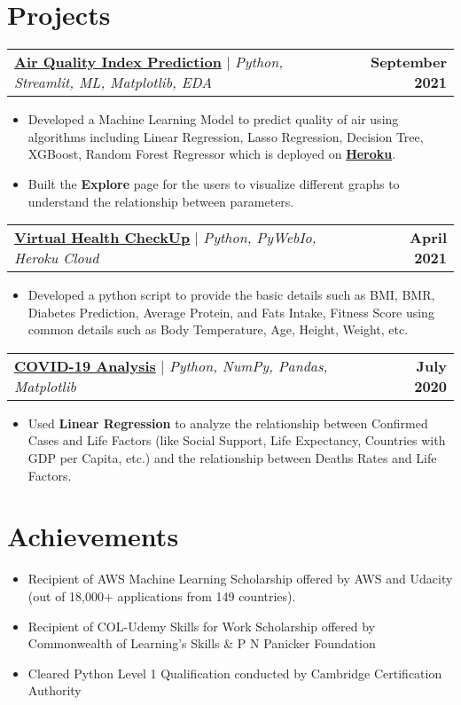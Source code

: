 \documentclass[letterpaper,11pt]{article}
\makeatletter
\newcommand{\resumeProjectItem}[1]{
  \item\small{
    {#1 \vspace{-5pt}}
  }
}
\newcommand{\resumeProjectHeading}[2]{
    \item
    \begin{tabular*}{1.001\textwidth}{l@{\extracolsep{\fill}}r}
      \small#1 & \textbf{\small #2}\\
    \end{tabular*}\vspace{-2pt}
}
\newcommand{\resumeItemListStart}{\begin{itemize}}
\newcommand{\resumeItemListEnd}{\end{itemize}\vspace{-5pt}}
\makeatother
\begin{document}
  
\section{Projects}
\vspace{-10pt}
    \resumeProjectSubHeadingListStart
      \resumeProjectHeading
          {\href{https://github.com/noor12401/Projects/tree/main/AQI}{\color{blue}\textbf{Air Quality Index Prediction}} $|$ \emph{Python, Streamlit, ML, Matplotlib, EDA}}{September 2021}
          \resumeItemListStart
          \resumeProjectItem {Developed a Machine Learning Model to predict quality of air using algorithms including Linear Regression, Lasso Regression, Decision Tree, XGBoost, Random Forest Regressor which is deployed on \textbf{\href{https://airqualityindexcheckerr.herokuapp.com/}{\color{blue}Heroku}}.}
          \resumeProjectItem{Built the \textbf{Explore} page for the users to visualize different graphs to understand the relationship between parameters.}
          \resumeItemListEnd
          \vspace{-24pt}
          \resumeProjectSubHeadingListStart
      \resumeProjectHeading
          {\href{https://github.com/noor12401/VirtualHealth}{\color{blue}\textbf{Virtual Health CheckUp}} $|$ \emph{Python, PyWebIo, Heroku Cloud}}{April 2021}
          \resumeItemListStart
          \resumeProjectItem {Developed a python script to provide the basic details such as BMI, BMR, Diabetes Prediction, Average Protein, and Fats Intake, Fitness Score using common details such as Body Temperature, Age, Height, Weight, etc.}
          \resumeItemListEnd
          \vspace{-12pt}
          \resumeProjectSubHeadingListStart
      \resumeProjectHeading
          {\href{https://github.com/noor12401/COVID-19-Analysis}{\color{blue}\textbf{COVID-19 Analysis}} $|$ \emph{Python, NumPy, Pandas, Matplotlib}}{July 2020}
          \resumeItemListStart
          \resumeProjectItem {Used \textbf{Linear Regression} to analyze the relationship between Confirmed Cases and Life Factors (like Social Support, Life Expectancy, Countries with GDP per Capita, etc.) and the relationship between Deaths Rates and Life Factors.}
          \resumeItemListEnd
    \resumeProjectSubHeadingListEnd
    \vspace{-15pt}

\section{Achievements}
    \resumeItemListStart
    \item Recipient of AWS Machine Learning Scholarship offered by AWS and Udacity (out of 18,000+ applications from 149 countries).
    \vspace{-5pt}
    \item Recipient of COL-Udemy Skills for Work Scholarship offered by Commonwealth of Learning's Skills & P N Panicker Foundation
    \vspace{-5pt}
    \item Cleared Python Level 1 Qualification conducted by Cambridge Certification Authority
    \resumeItemListEnd
    \vspace{-12pt}
\end{document}
